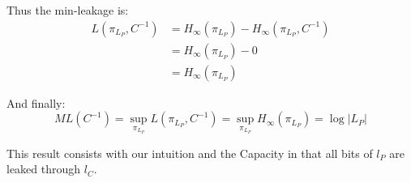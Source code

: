 Thus the min-leakage is:
\begin{equation}
	\begin{aligned}
	L(\pi_{L_P}, C^{-1}) 
	 &= H_{\infty}(\pi_{L_P}) - H_{\infty}(\pi_{L_{P}}, C^{-1}) \\
	 &= H_{\infty}(\pi_{L_P}) - 0 \\
	 &= H_{\infty}(\pi_{L_P})
	\end{aligned}
\end{equation}

And finally:
\begin{equation}
	ML(C^{-1}) = \sup_{\pi_{L_P}}{L(\pi_{L_P},C^{-1})} =  \sup_{\pi_{L_P}} H_{\infty}(\pi_{L_P}) = \log{|L_P|}
\end{equation}

This result consists with our intuition and the Capacity in  that all bits of $l_P$ are leaked through $l_C$.